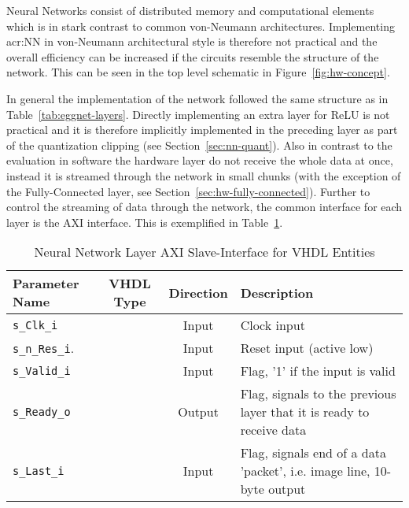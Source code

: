 
Neural Networks consist of distributed memory and computational elements which is in stark contrast to common von-Neumann architectures. Implementing \gls{acr:NN} in von-Neumann architectural style is therefore not practical and the overall efficiency can be increased if the circuits resemble the structure of the network. This can be seen in the top level schematic in Figure~\ref{fig:hw-concept}.

In general the implementation of the network followed the same structure as in Table~\ref{tab:eggnet-layers}. Directly implementing an extra layer for ReLU is not practical and it is therefore implicitly implemented in the preceding layer as part of the quantization clipping (see Section~\ref{sec:nn-quant}). Also in contrast to the evaluation in software the hardware layer do not receive the whole data at once, instead it is streamed through the network in small chunks (with the exception of the Fully-Connected layer, see Section~\ref{sec:hw-fully-connected}). Further to control the streaming of data through the network, the common interface for each layer is the AXI interface. This is exemplified in Table~\ref{tab:hw-layer-interface}.

\begin{table}[h!]
\centering	
\begin{tabular}{l|ccl}
	\toprule
	Parameter Name 		   	   & VHDL Type  & Direction & Description 								\\
	\midrule
	\texttt{s\_Clk\_i} 	       & \stdlogic  & Input 	    & Clock input								\\
	\texttt{s\_n\_Res\_i}.     & \stdlogic  & Input 	    & Reset input (active low)					\\
	\texttt{s\_Valid\_i} 	   & \stdlogic  & Input 	    & Flag, '1' if the input is valid				\\
	\texttt{s\_Ready\_o} 	   & \stdlogic  & Output 	    & Flag, signals to the previous layer that it is ready to receive data								\\
	\texttt{s\_Last\_i} 	   & \stdlogic  & Input 	    & Flag, signals end of a data 'packet', i.e. image line, 10-byte output		\\
	\bottomrule
\end{tabular}
\caption{Neural Network Layer AXI Slave-Interface for VHDL Entities}
\label{tab:hw-layer-interface}
\end{table}

